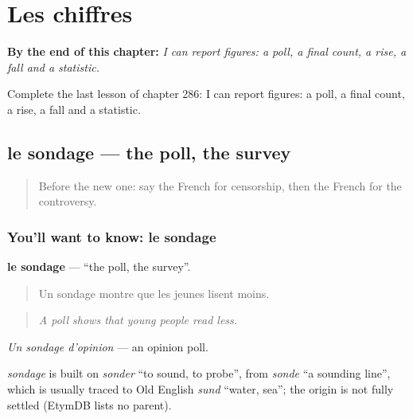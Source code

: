 
\chapter{Les chiffres}
\label{ch:fr-les-chiffres}

\begin{chapteropening}
\textbf{By the end of this chapter:} \emph{I can report figures: a poll, a final count, a rise, a fall and a statistic.}

Complete the last lesson of chapter 286: I can report figures: a poll, a final count, a rise, a fall and a statistic.
\end{chapteropening}

\section[le sondage]{le sondage — the poll, the survey}

\label{lesson:FR-C286-sondage}



\begin{quote}
Before the new one: say the French for censorship, then the French for the controversy.
\end{quote}

\subsection*{You'll want to know: le sondage}
\textbf{le sondage} — \textquotedblleft{}the poll, the survey\textquotedblright{}.

\begin{quote}
Un sondage montre que les jeunes lisent moins.
\end{quote}

\begin{quote}
\emph{A poll shows that young people read less.}
\end{quote}

\emph{Un sondage d'opinion} — an opinion poll.

\begin{cousinweb}
\emph{sondage} is built on \emph{sonder} \textquotedblleft{}to sound, to probe\textquotedblright{}, from \emph{sonde} \textquotedblleft{}a sounding line\textquotedblright{}, which is usually traced to Old English \emph{sund} \textquotedblleft{}water, sea\textquotedblright{}; the origin is not fully settled (EtymDB lists no parent).
\end{cousinweb}

